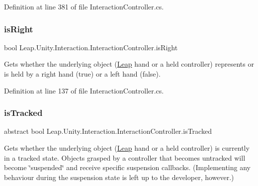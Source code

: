 Definition at line 381 of file Interaction\+Controller.\+cs.

\mbox{\label{class_leap_1_1_unity_1_1_interaction_1_1_interaction_controller_af27c573638d3cb8b5886f0f6b12347d9}} 
\subsubsection{\texorpdfstring{isRight}{isRight}}
{\footnotesize\ttfamily bool Leap.\+Unity.\+Interaction.\+Interaction\+Controller.\+is\+Right\hspace{0.3cm}{\ttfamily [get]}}



Gets whether the underlying object (\mbox{\hyperlink{namespace_leap_1_1_unity_1_1_leap}{Leap}} hand or a held controller) represents or is held by a right hand (true) or a left hand (false). 



Definition at line 137 of file Interaction\+Controller.\+cs.

\mbox{\label{class_leap_1_1_unity_1_1_interaction_1_1_interaction_controller_a592bdfe3ece33ca9ce7a35f279fcacbf}} 
\subsubsection{\texorpdfstring{isTracked}{isTracked}}
{\footnotesize\ttfamily abstract bool Leap.\+Unity.\+Interaction.\+Interaction\+Controller.\+is\+Tracked\hspace{0.3cm}{\ttfamily [get]}}



Gets whether the underlying object (\mbox{\hyperlink{namespace_leap_1_1_unity_1_1_leap}{Leap}} hand or a held controller) is currently in a tracked state. Objects grasped by a controller that becomes untracked will become \char`\"{}suspended\char`\"{} and receive specific suspension callbacks. (Implementing any behaviour during the suspension state is left up to the developer, however.) 



